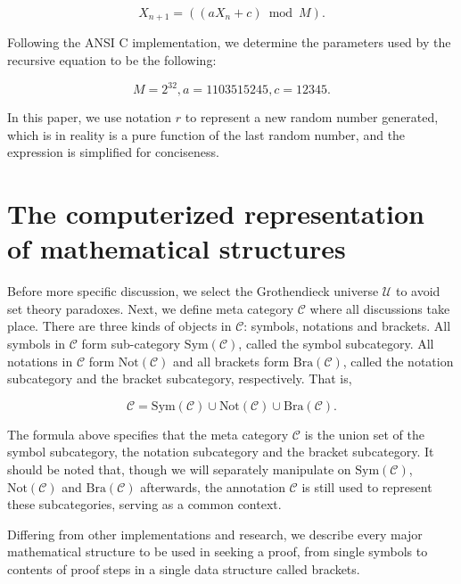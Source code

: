 \documentclass{aims}
\numberwithin{equation}{section}
\numberwithin{theorem}{section}	%
\numberwithin{axiom}{section}	%
\numberwithin{definition}{section}	%
\begin{document}
	\begin{equation*}
		X_{n+1}=(\left(a X_n+c\right) \bmod M).
	\end{equation*}
	
	Following the ANSI C implementation, we determine the parameters used by the recursive equation to be the following:
	
	\begin{equation*}
		M=2^{32},a=1103515245, c=12345.
	\end{equation*}
	
	In this paper, we use notation \(\mathit{r}\) to represent a new random number generated, which is in reality is a pure function of the last random number, and the expression is simplified for conciseness.
	
	\section{The computerized representation of mathematical structures}
	
	Before more specific discussion, we select the Grothendieck universe \(\mathcal{U}\) \cite{Li2019} to avoid set theory paradoxes. Next, we define meta category \(\mathcal{C}\) where all discussions take place. There are three kinds of objects in \(\mathcal{C}\): symbols, notations and brackets. All symbols in \(\mathcal{C}\) form sub-category \(\text{Sym}(\mathcal{C})\), called the{ symbol subcategory}. All notations in \(\mathcal{C}\) form \(\text{Not}(\mathcal{C})\) and all brackets form \(\text{Bra}(\mathcal{C})\), called the{ notation subcategory} and the{ bracket subcategory}, respectively. That is,
	
	\begin{equation}
		\mathcal{C}=\text{Sym}(\mathcal{C})\cup \text{Not}(\mathcal{C})\cup \text{Bra}(\mathcal{C}).
	\end{equation}
	
	The formula above specifies that the meta category \(\mathcal{C}\) is the union set of the symbol subcategory, the notation subcategory and the bracket subcategory. It should be noted that, though we will separately manipulate on \(\text{Sym}(\mathcal{C})\), \(\text{Not}(\mathcal{C})\) and \(\text{Bra}(\mathcal{C})\) afterwards, the annotation \(\mathcal{C}\) is still used to represent these subcategories, serving as a common context.
	
	Differing from other implementations and research, we describe every major mathematical structure to be used in seeking a proof, from single symbols to contents of proof steps in a single data structure called brackets.
	
\end{document}
